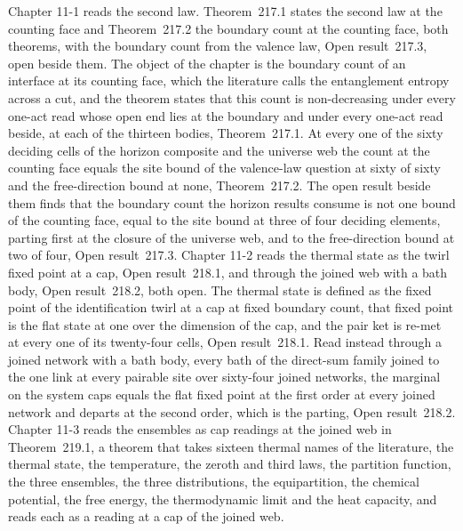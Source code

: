 Chapter 11-1 reads the second law. Theorem~217.1 states the second law at the counting face and Theorem~217.2 the boundary count at the counting face, both theorems, with the boundary count from the valence law, Open result~217.3, open beside them. The object of the chapter is the boundary count of an interface at its counting face, which the literature calls the entanglement entropy across a cut, and the theorem states that this count is non-decreasing under every one-act read whose open end lies at the boundary and under every one-act read beside, at each of the thirteen bodies, Theorem~217.1. At every one of the sixty deciding cells of the horizon composite and the universe web the count at the counting face equals the site bound of the valence-law question at sixty of sixty and the free-direction bound at none, Theorem~217.2. The open result beside them finds that the boundary count the horizon results consume is not one bound of the counting face, equal to the site bound at three of four deciding elements, parting first at the closure of the universe web, and to the free-direction bound at two of four, Open result~217.3. Chapter 11-2 reads the thermal state as the twirl fixed point at a cap, Open result~218.1, and through the joined web with a bath body, Open result~218.2, both open. The thermal state is defined as the fixed point of the identification twirl at a cap at fixed boundary count, that fixed point is the flat state at one over the dimension of the cap, and the pair ket is re-met at every one of its twenty-four cells, Open result~218.1. Read instead through a joined network with a bath body, every bath of the direct-sum family joined to the one link at every pairable site over sixty-four joined networks, the marginal on the system caps equals the flat fixed point at the first order at every joined network and departs at the second order, which is the parting, Open result~218.2. Chapter 11-3 reads the ensembles as cap readings at the joined web in Theorem~219.1, a theorem that takes sixteen thermal names of the literature, the thermal state, the temperature, the zeroth and third laws, the partition function, the three ensembles, the three distributions, the equipartition, the chemical potential, the free energy, the thermodynamic limit and the heat capacity, and reads each as a reading at a cap of the joined web.

